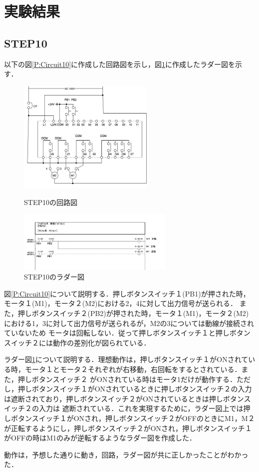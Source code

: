 \documentclass[a4paper,11pt]{jsarticle}
\begin{document}
\section{実験結果}
\subsection{STEP10}
以下の図\ref{P:Circuit10}に作成した回路図を示し，図\ref{C:Step10}に作成したラダー図を示す．
\begin{figure}[H]
  \begin{minipage}{0.38\textwidth}
    \begin{center}
      \includegraphics[clip,width=6.5cm]{picture/Circuit10.png}
    \end{center}
    \caption{STEP10の回路図}
    \label{P:Circuit10}
  \end{minipage}
  \begin{minipage}{0.58\textwidth}
    \begin{center}
      \includegraphics[clip,width=7.5cm]{picture/Step10.pdf}
    \end{center}
    \caption{STEP10のラダー図}
    \label{C:Step10}
  \end{minipage}
\end{figure}
図\ref{P:Circuit10}について説明する．押しボタンスイッチ１(PB1)が押された時，モータ１(M1)，モータ２(M2)における2，4に対して出力信号が送られる．
また，押しボタンスイッチ２(PB2)が押された時，モータ１(M1)，モータ２(M2)における1，3に対して出力信号が送られるが，M2の3については動線が接続されていないため
モータは回転しない．従って押しボタンスイッチ１と押しボタンスイッチ２には動作の差別化が図られている．
\par
ラダー図\ref{C:Step10}について説明する．理想動作は，押しボタンスイッチ１がONされている時，モータ１とモータ２それぞれが右移動，右回転をするとされている．また，押しボタンスイッチ２
がONされている時はモータ1だけが動作する．ただし，押しボタンスイッチ１がONされているときに押しボタンスイッチ２の入力は遮断されており，押しボタンスイッチ２がONされているときは押しボタンスイッチ２の入力は
遮断されている．これを実現するために，ラダー図上では押しボタンスイッチ１がONされ，押しボタンスイッチ２がOFFのときにM1，M２が正転するようにし，押しボタンスイッチ２がONされ，押しボタンスイッチ１がOFFの時はM1のみが逆転するようなラダー図を作成した．
\par
動作は，予想した通りに動き，回路，ラダー図が共に正しかったことがわかった．
\end{document}
